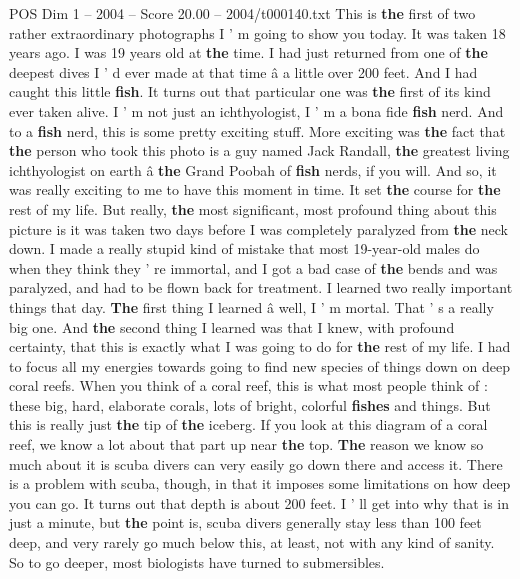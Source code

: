 \begin{textsample}{POS Dim 1 – 2004 – Score 20.00 – 2004/t000140.txt}  \label{ex:f1_pos_023}
This is \textbf{the} first of two rather extraordinary photographs I ' m going to show you today.
It was taken 18 years ago.
I was 19 years old at \textbf{the} time.
I had just returned from one of \textbf{the} deepest dives I ' d ever made at that time â a little over 200 feet.
And I had caught this little \textbf{fish}.
It turns out that particular one was \textbf{the} first of its kind ever taken alive.
I ' m not just an ichthyologist, I ' m a bona fide \textbf{fish} nerd.
And to a \textbf{fish} nerd, this is some pretty exciting stuff.
More exciting was \textbf{the} fact that \textbf{the} person who took this photo is a guy named Jack Randall, \textbf{the} greatest living ichthyologist on earth â \textbf{the} Grand Poobah of \textbf{fish} nerds, if you will.
And so, it was really exciting to me to have this moment in time.
It set \textbf{the} course for \textbf{the} rest of my life.
But really, \textbf{the} most significant, most profound thing about this picture is it was taken two days before I was completely paralyzed from \textbf{the} neck down.
I made a really stupid kind of mistake that most 19-year-old males do when they think they ' re immortal, and I got a bad case of \textbf{the} bends and was paralyzed, and had to be flown back for treatment.
I learned two really important things that day. \textbf{The} first thing I learned â well, I ' m mortal.
That ' s a really big one.
And \textbf{the} second thing I learned was that I knew, with profound certainty, that this is exactly what I was going to do for \textbf{the} rest of my life.
I had to focus all my energies towards going to find new species of things down on deep coral reefs.
When you think of a coral reef, this is what most people think of : these big, hard, elaborate corals, lots of bright, colorful \textbf{fishes} and things.
But this is really just \textbf{the} tip of \textbf{the} iceberg.
If you look at this diagram of a coral reef, we know a lot about that part up near \textbf{the} top. \textbf{The} reason we know so much about it is scuba divers can very easily go down there and access it.
There is a problem with scuba, though, in that it imposes some limitations on how deep you can go.
It turns out that depth is about 200 feet.
I ' ll get into why that is in just a minute, but \textbf{the} point is, scuba divers generally stay less than 100 feet deep, and very rarely go much below this, at least, not with any kind of sanity.
So to go deeper, most biologists have turned to submersibles.

\end{textsample}
